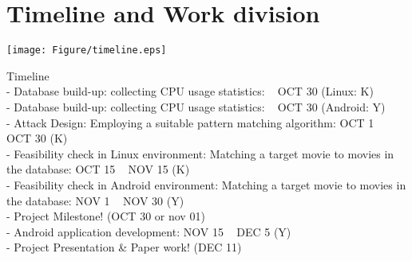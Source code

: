 \section{Timeline and Work division}
\label{sec:timeline}

\texttt{[image: Figure/timeline.eps]}

Timeline\\
- Database build-up: collecting CPU usage statistics: ~ OCT 30 (Linux: K) \\
- Database build-up: collecting CPU usage statistics: ~ OCT 30 (Android: Y) \\
- Attack Design: Employing a suitable pattern matching algorithm: OCT 1  ~ OCT 30 (K)\\
- Feasibility check in Linux environment: Matching a target movie to movies in the database: OCT 15 ~ NOV 15 (K)\\
- Feasibility check in Android environment: Matching a target movie to movies in the database: NOV 1 ~ NOV 30 (Y)\\
- Project Milestone!  (OCT 30 or nov 01)\\
- Android application development: NOV 15 ~ DEC 5 (Y)\\
- Project Presentation \& Paper work! (DEC 11)
